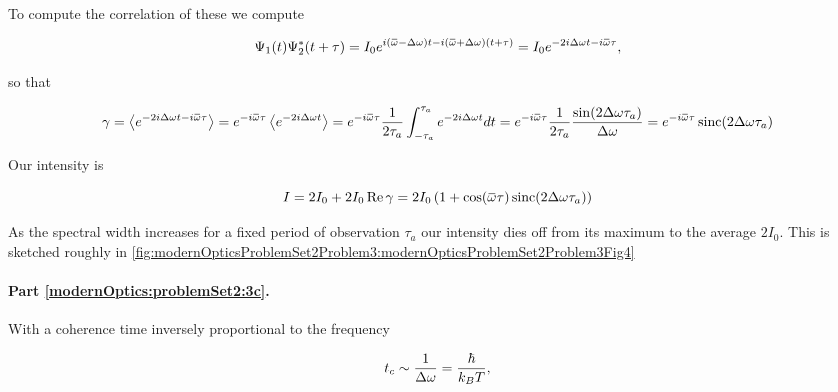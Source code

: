 {To compute the correlation of these we compute

\begin{dmath}\label{eqn:modernOptics:ProblemSet2:P3:570}
\Psi_1(t) \Psi_2^\conj(t + \tau)
= 
I_0 e^{
i (\overbar{\omega} - \Delta \omega) t
-i (\overbar{\omega} + \Delta \omega) (t + \tau)
}
=
I_0 e^{ -2 i \Delta \omega t - i \overbar{\omega} \tau},
\end{dmath}

so that 

\begin{dmath}\label{eqn:modernOptics:ProblemSet2:P3:590}
\gamma 
= \expectation{ e^{ -2 i \Delta \omega t - i \overbar{\omega} \tau} }
= e^{- i \overbar{\omega} \tau }
\expectation{ e^{ -2 i \Delta \omega t } }
= e^{- i \overbar{\omega} \tau }
\inv{2 \tau_a}
\int_{-\tau_a}^{\tau_a} e^{ -2 i \Delta \omega t } dt
= 
e^{- i \overbar{\omega} \tau }
\inv{2 \tau_a}
\frac{\sin(2 \Delta \omega \tau_a)}{\Delta \omega }
= 
e^{- i \overbar{\omega} \tau } \sinc( 2 \Delta \omega \tau_a )
\end{dmath}

Our intensity is

\begin{dmath}\label{eqn:modernOptics:ProblemSet2:P3:610}
I 
= 2 I_0 + 2 I_0 \Real \gamma
= 2 I_0 \left( 1 + \cos( \overbar{\omega} \tau ) \sinc( 2 \Delta \omega \tau_a ) \right)
\end{dmath}

As the spectral width increases for a fixed period of observation $\tau_a$ our intensity dies off from its maximum to the average $2 I_0$.  This is sketched roughly in \cref{fig:modernOpticsProblemSet2Problem3:modernOpticsProblemSet2Problem3Fig4} 



\paragraph{Part \ref{modernOptics:problemSet2:3c}.  }

With a coherence time inversely proportional to the frequency

\begin{dmath}\label{eqn:modernOptics:ProblemSet2:P3:630}
t_c \sim \inv{\Delta \omega} = \frac{\hbar}{k_B T},
\end{dmath}

}
